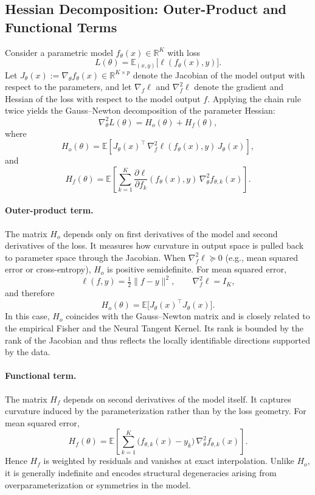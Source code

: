 \documentclass{article}
\theoremstyle{definition}
\begin{document}
\subsection{Hessian Decomposition: Outer-Product and Functional Terms}
Consider a parametric model $f_\theta(x) \in \mathbb{R}^K$ with loss
\[
L(\theta) = \mathbb{E}_{(x,y)}\big[\ell(f_\theta(x),y)\big].
\]
Let $J_\theta(x) := \nabla_\theta f_\theta(x) \in \mathbb{R}^{K \times p}$ denote the Jacobian of the model output with respect to the parameters, and let $\nabla_f \ell$ and $\nabla_f^2 \ell$ denote the gradient and Hessian of the loss with respect to the model output $f$. Applying the chain rule twice yields the Gauss--Newton decomposition of the parameter Hessian:
\[
\nabla_\theta^2 L(\theta)
=
H_o(\theta)
+
H_f(\theta),
\]
where
\[
H_o(\theta)
=
\mathbb{E}\!\left[
J_\theta(x)^\top \, \nabla_f^2 \ell(f_\theta(x),y) \, J_\theta(x)
\right],
\]
and
\[
H_f(\theta)
=
\mathbb{E}\!\left[
\sum_{k=1}^K
\frac{\partial \ell}{\partial f_k}(f_\theta(x),y)
\,
\nabla_\theta^2 f_{\theta,k}(x)
\right].
\]

\paragraph{Outer-product term.}
The matrix $H_o$ depends only on first derivatives of the model and second derivatives of the loss. It measures how curvature in output space is pulled back to parameter space through the Jacobian. When $\nabla_f^2 \ell \succeq 0$ (e.g., mean squared error or cross-entropy), $H_o$ is positive semidefinite. For mean squared error,
\[
\ell(f,y) = \tfrac12 \|f-y\|^2,
\qquad
\nabla_f^2 \ell = I_K,
\]
and therefore
\[
H_o(\theta) = \mathbb{E}\big[J_\theta(x)^\top J_\theta(x)\big].
\]
In this case, $H_o$ coincides with the Gauss--Newton matrix and is closely related to the empirical Fisher and the Neural Tangent Kernel. Its rank is bounded by the rank of the Jacobian and thus reflects the locally identifiable directions supported by the data.

\paragraph{Functional term.}
The matrix $H_f$ depends on second derivatives of the model itself. It captures curvature induced by the parameterization rather than by the loss geometry. For mean squared error,
\[
H_f(\theta)
=
\mathbb{E}\!\left[
\sum_{k=1}^K
\big(f_{\theta,k}(x)-y_k\big)
\, \nabla_\theta^2 f_{\theta,k}(x)
\right].
\]
Hence $H_f$ is weighted by residuals and vanishes at exact interpolation. Unlike $H_o$, it is generally indefinite and encodes structural degeneracies arising from overparameterization or symmetries in the model.
\end{document}
